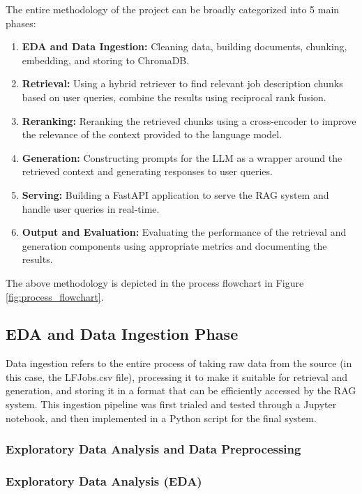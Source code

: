 ﻿\documentclass{article}
\begin{document}
The entire methodology of the project can be broadly categorized into 5 main phases:
\begin{enumerate}
	\item \textbf{EDA and Data Ingestion:} Cleaning data, building documents, chunking, embedding, and storing to ChromaDB.
	\item \textbf{Retrieval:} Using a hybrid retriever to find relevant job description chunks based on user queries, combine the results using reciprocal rank fusion.
	\item \textbf{Reranking:} Reranking the retrieved chunks using a cross-encoder to improve the relevance of the context provided to the language model.
	\item \textbf{Generation:} Constructing prompts for the LLM as a wrapper around the retrieved context and generating responses to user queries.
	\item \textbf{Serving:} Building a FastAPI application to serve the RAG system and handle user queries in real-time.
	\item \textbf{Output and Evaluation:} Evaluating the performance of the retrieval and generation components using appropriate metrics and documenting the results.
\end{enumerate}

The above methodology is depicted in the process flowchart in Figure \ref{fig:process_flowchart}.

\subsection{EDA and Data Ingestion Phase}

Data ingestion refers to the entire process of taking raw data from the source (in this case, the LFJobs.csv file), 
processing it to make it suitable for retrieval and generation, and storing it in a format that can be efficiently accessed by the RAG system.
This ingestion pipeline was first trialed and tested through a Jupyter notebook, and then implemented in a Python script for the final system.

\subsubsection*{Exploratory Data Analysis and Data Preprocessing}

\subsubsection*{Exploratory Data Analysis (EDA)}
\end{document}
